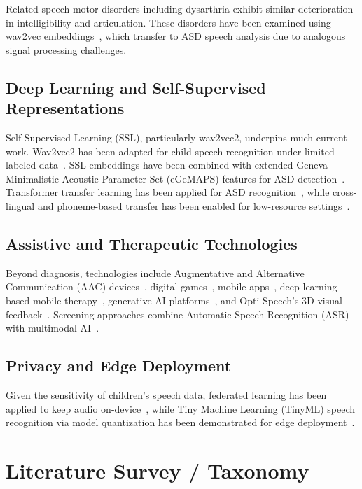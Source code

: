 \documentclass[conference]{IEEEtran}
\begin{document}
Related speech motor disorders including dysarthria exhibit similar deterioration in intelligibility and articulation. These disorders have been examined using wav2vec embeddings~\cite{ref4,ref20}, which transfer to ASD speech analysis due to analogous signal processing challenges.

\subsection{Deep Learning and Self-Supervised Representations}

Self-Supervised Learning (SSL), particularly wav2vec2, underpins much current work. Wav2vec2 has been adapted for child speech recognition under limited labeled data~\cite{ref1}. SSL embeddings have been combined with extended Geneva Minimalistic Acoustic Parameter Set (eGeMAPS) features for ASD detection~\cite{ref2}. Transformer transfer learning has been applied for ASD recognition~\cite{ref3}, while cross-lingual and phoneme-based transfer has been enabled for low-resource settings~\cite{ref5,ref22}.

\subsection{Assistive and Therapeutic Technologies}

Beyond diagnosis, technologies include Augmentative and Alternative Communication (AAC) devices~\cite{ref17}, digital games~\cite{ref12}, mobile apps~\cite{ref13}, deep learning-based mobile therapy~\cite{ref14}, generative AI platforms~\cite{ref15}, and Opti-Speech's 3D visual feedback~\cite{ref16}. Screening approaches combine Automatic Speech Recognition (ASR)~\cite{ref9} with multimodal AI~\cite{ref10}.

\subsection{Privacy and Edge Deployment}

Given the sensitivity of children's speech data, federated learning has been applied to keep audio on-device~\cite{ref24}, while Tiny Machine Learning (TinyML) speech recognition via model quantization has been demonstrated for edge deployment~\cite{ref23}.

\section{Literature Survey / Taxonomy}
\label{sec:survey}
\end{document}
